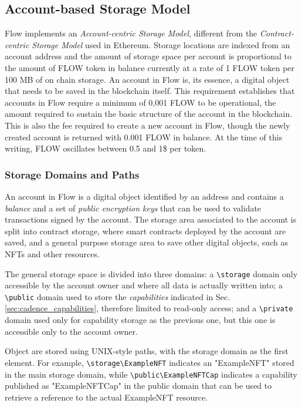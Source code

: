 \documentclass[../NFTComp_IEEE.tex]{subfiles}
\begin{document}
\subsection{Account-based Storage Model}
Flow implements an \textit{Account-centric Storage Model}, different from the \textit{Contract-centric Storage Model} used in Ethereum. Storage locations are indexed from an account address and the amount of storage space per account is proportional to the amount of FLOW token in balance currently at a rate of 1 FLOW token per 100 MB of on chain storage. An account in Flow is, its essence, a digital object that needs to be saved in the blockchain itself. This requirement establishes that accounts in Flow require a minimum of 0,001 FLOW to be operational, the amount required to sustain the basic structure of the account in the blockchain. This is also the fee required to create a new account in Flow, though the newly created account is returned with 0.001 FLOW in balance. At the time of this writing, FLOW oscillates between 0.5 and 1\$ per token.

\subsubsection{Storage Domains and Paths}
\label{sec:cadence_storage_domain}
An account in Flow is a digital object identified by an address and contains a \textit{balance} and a set of \textit{public encryption keys} that can be used to validate transactions signed by the account. The storage area associated to the account is split into contract storage, where smart contracts deployed by the account are saved, and a general purpose storage area to save other digital objects, such as NFTs and other resources.
\par
The general storage space is divided into three domains: a \verb |\storage| domain only accessible by the account owner and where all data is actually written into; a \verb |\public| domain used to store the \textit{capabilities} indicated in Sec. \ref{sec:cadence_capabilities}, therefore limited to read-only access; and a \verb |\private| domain used only for capability storage as the previous one, but this one is accessible only to the account owner.
\par
Object are stored using UNIX-style paths, with the storage domain as the first element. For example, \verb |\storage\ExampleNFT| indicates an "ExampleNFT" stored in the main storage domain, while \verb |\public\ExampleNFTCap| indicates a capability published as "ExampleNFTCap" in the public domain that can be used to retrieve a reference to the actual ExampleNFT resource.
\end{document}
